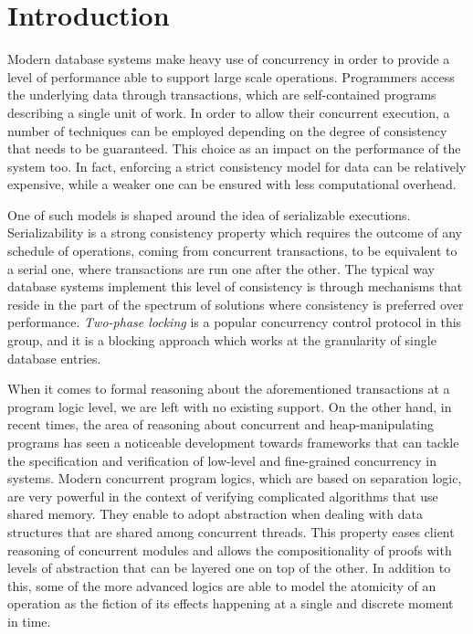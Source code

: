 \section{Introduction}

Modern database systems make heavy use of concurrency in order to provide a level of performance able to support large scale operations. Programmers access the underlying data through transactions, which are self-contained programs describing a single unit of work. In order to allow their concurrent execution, a number of techniques can be employed depending on the degree of consistency that needs to be guaranteed. This choice as an impact on the performance of the system too. In fact, enforcing a strict consistency model for data can be relatively expensive, while a weaker one can be ensured with less computational overhead.

One of such models is shaped around the idea of serializable executions. Serializability is a strong consistency property which requires the outcome of any schedule of operations, coming from concurrent transactions, to be equivalent to a serial one, where transactions are run one after the other. The typical way database systems implement this level of consistency is through mechanisms that reside in the part of the spectrum of solutions where consistency is preferred over performance. \textit{Two-phase locking} is a popular concurrency control protocol in this group, and it is a blocking approach which works at the granularity of single database entries.

When it comes to formal reasoning about the aforementioned transactions at a program logic level, we are left with no existing support. On the other hand, in recent times, the area of reasoning about concurrent and heap-manipulating programs has seen a noticeable development towards frameworks that can tackle the specification and verification of low-level and fine-grained concurrency in systems. Modern concurrent program logics, which are based on separation logic, are very powerful in the context of verifying complicated algorithms that use shared memory. They enable to adopt abstraction when dealing with data structures that are shared among concurrent threads. This property eases client reasoning of concurrent modules and allows the compositionality of proofs with levels of abstraction that can be layered one on top of the other. In addition to this, some of the more advanced logics are able to model the atomicity of an operation as the fiction of its effects happening at a single and discrete moment in time.

